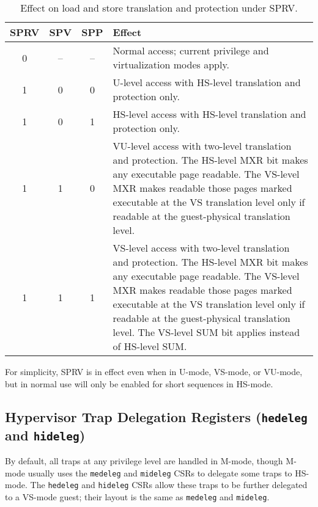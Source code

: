 \begin{table*}[h!]
\begin{center}
\begin{tabular}{|c|c|c||p{4.7in}|}
  \hline
   SPRV & SPV & SPP & Effect \\ \hline \hline
   0    & --  & --  & Normal access; current privilege and virtualization modes apply. \\ \hline
   1    & 0   & 0   & U-level access with HS-level translation and protection only. \\ \hline
   1    & 0   & 1   & HS-level access with HS-level translation and protection only. \\ \hline
   1    & 1   & 0   & VU-level access with two-level translation and protection. The HS-level MXR bit makes any executable page readable.  The VS-level MXR makes readable those pages marked executable at the VS translation level only if readable at the guest-physical translation level. \\ \hline
   1    & 1   & 1   & VS-level access with two-level translation and protection. The HS-level MXR bit makes any executable page readable.  The VS-level MXR makes readable those pages marked executable at the VS translation level only if readable at the guest-physical translation level.  The VS-level SUM bit applies instead of HS-level SUM. \\ \hline
 \end{tabular}
\end{center}
\caption{Effect on load and store translation and protection under SPRV.}
\label{h-sprv}
\end{table*}

\begin{commentary}
For simplicity, SPRV is in effect even when in U-mode, VS-mode, or VU-mode, but
in normal use will only be enabled for short sequences in HS-mode.
\end{commentary}

\subsection{Hypervisor Trap Delegation Registers ({\tt hedeleg} and {\tt hideleg})}

By default, all traps at any privilege level are handled in M-mode, though
M-mode usually uses the {\tt medeleg} and {\tt mideleg} CSRs to delegate
some traps to HS-mode.  The {\tt hedeleg} and {\tt hideleg} CSRs allow these
traps to be further delegated to a VS-mode guest; their layout is the same
as {\tt medeleg} and {\tt mideleg}.

